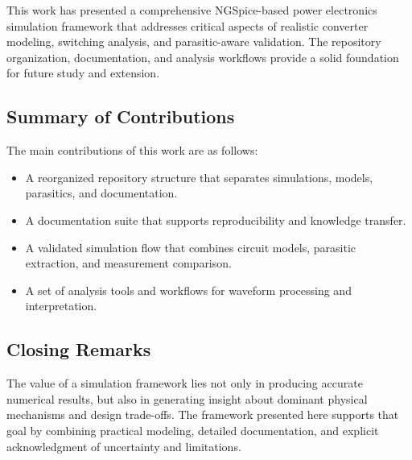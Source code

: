 This work has presented a comprehensive NGSpice-based power electronics simulation framework that addresses critical aspects of realistic converter modeling, switching analysis, and parasitic-aware validation. The repository organization, documentation, and analysis workflows provide a solid foundation for future study and extension.

\subsection{Summary of Contributions}
The main contributions of this work are as follows:
\begin{itemize}
    \item A reorganized repository structure that separates simulations, models, parasitics, and documentation.
    \item A documentation suite that supports reproducibility and knowledge transfer.
    \item A validated simulation flow that combines circuit models, parasitic extraction, and measurement comparison.
    \item A set of analysis tools and workflows for waveform processing and interpretation.
\end{itemize}

\subsection{Closing Remarks}
The value of a simulation framework lies not only in producing accurate numerical results, but also in generating insight about dominant physical mechanisms and design trade-offs. The framework presented here supports that goal by combining practical modeling, detailed documentation, and explicit acknowledgment of uncertainty and limitations.
